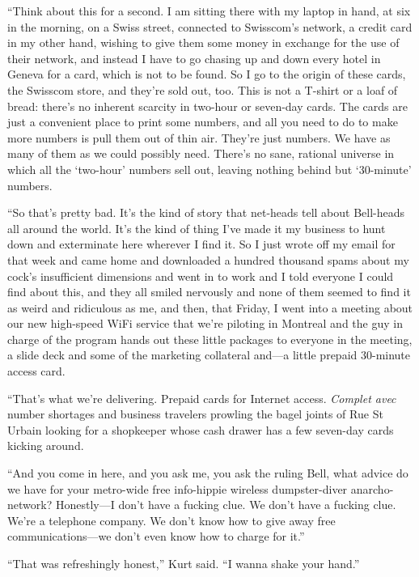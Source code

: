 ``Think about this for a second.  I am sitting there with my laptop in
hand, at six in the morning, on a Swiss street, connected to
Swisscom's network, a credit card in my other hand, wishing to give
them some money in exchange for the use of their network, and instead
I have to go chasing up and down every hotel in Geneva for a card,
which is not to be found.  So I go to the origin of these cards, the
Swisscom store, and they're sold out, too.  This is not a T-shirt or a
loaf of bread:  there's no inherent scarcity in two-hour or seven-day
cards.  The cards are just a convenient place to print some numbers,
and all you need to do to make more numbers is pull them out of thin
air.  They're just numbers.  We have as many of them as we could
possibly need.  There's no sane, rational universe in which all the
`two-hour' numbers sell out, leaving nothing behind but `30-minute'
numbers.

``So that's pretty bad.  It's the kind of story that net-heads tell
about Bell-heads all around the world.  It's the kind of thing I've
made it my business to hunt down and exterminate here wherever I find
it.  So I just wrote off my email for that week and came home and
downloaded a hundred thousand spams about my cock's insufficient
dimensions and went in to work and I told everyone I could find about
this, and they all smiled nervously and none of them seemed to find it
as weird and ridiculous as me, and then, that Friday, I went into a
meeting about our new high-speed WiFi service that we're piloting in
Montreal and the guy in charge of the program hands out these little
packages to everyone in the meeting, a slide deck and some of the
marketing collateral and---a little prepaid 30-minute access card.

``That's what we're delivering.  Prepaid cards for Internet access. 
\textit{Complet avec} number shortages and business travelers prowling
the bagel joints of Rue St Urbain looking for a shopkeeper whose cash
drawer has a few seven-day cards kicking around.

``And you come in here, and you ask me, you ask the ruling Bell, what
advice do we have for your metro-wide free info-hippie wireless
dumpster-diver anarcho-network?  Honestly---I don't have a fucking
clue.  We don't have a fucking clue.  We're a telephone company.  We
don't know how to give away free communications---we don't even know
how to charge for it.''

``That was refreshingly honest,'' Kurt said.  ``I wanna shake your
hand.''

